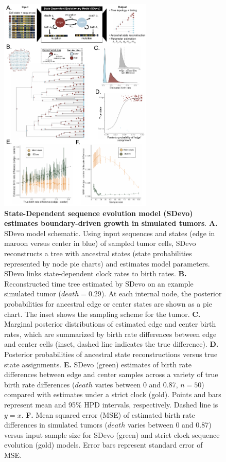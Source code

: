 \documentclass[12pt]{elife_based}
\begin{document}
\begin{figure}
    \centering
    \includegraphics[width=0.65\textwidth]{figures/fig3_ML_aff_ML2.pdf}

    \caption{\textbf{State-Dependent sequence evolution model (SDevo) estimates boundary-driven growth in simulated tumors}. \textbf{A.} SDevo model schematic. Using input sequences and states (edge in maroon versus center in blue) of sampled tumor cells, SDevo reconstructs a tree with ancestral states (state probabilities represented by node pie charts) and estimates model parameters. SDevo links state-dependent clock rates to birth rates. \textbf{B.} Reconstructed time tree estimated by SDevo on an example simulated tumor ($death = 0.29$). At each internal node, the posterior probabilities for ancestral edge or center states are shown as a pie chart. The inset shows the sampling scheme for the tumor. \textbf{C.} Marginal posterior distributions of estimated edge and center birth rates, which are summarized by birth rate differences between edge and center cells (inset, dashed line indicates the true difference). \textbf{D.} Posterior probabilities of ancestral state reconstructions versus true state assignments. \textbf{E.} SDevo (green) estimates of birth rate differences between edge and center samples across a variety of true birth rate differences ($death$ varies between 0 and 0.87, $n = 50$) compared with estimates under a strict clock (gold). Points and bars represent mean and 95\% HPD intervals, respectively. Dashed line is $y=x$. \textbf{F.} Mean squared error (MSE) of estimated birth rate differences in simulated tumors ($death$ varies between 0 and 0.87) versus input sample size for SDevo (green) and strict clock sequence evolution (gold) models. Error bars represent standard error of MSE.}
    \label{Fig3}
\end{figure} 
\end{document}
